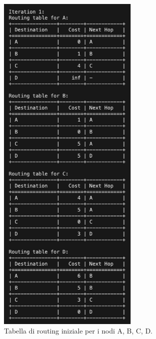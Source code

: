 \documentclass{report}
\begin{document}
\begin{figure}[H]
    \centering
    \includegraphics[width=0.6\textwidth]{img/rete2inizio.png}
    \caption{Tabella di routing iniziale per i nodi A, B, C, D.}
    \label{fig:initial_routing_table_2}
\end{figure}
\end{document}

